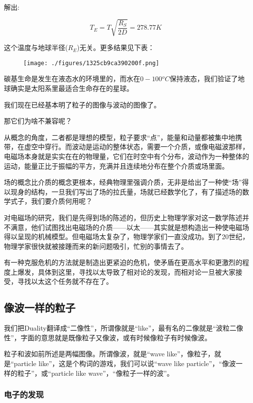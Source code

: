 解出:

\begin{equation}
T_E = T \sqrt{\frac{R_S}{2D}} = 278.77 K~
\end{equation}

这个温度与地球半径($R_E$)无关。更多结果见下表：

\begin{figure}[ht]
\centering
\texttt{[image: ./figures/1325cb9ca390200f.png]}
\caption \label{fig_QMPre5_8}
\end{figure}

碳基生命是发生在液态水的环境里的，而水在$0 - 100 {}^o C$保持液态，我们验证了地球确实是太阳系里最适合生命存在的星球。

我们现在已经基本明了粒子的图像与波动的图像了。

那它们为啥不兼容呢？

从概念的角度，二者都是理想的模型，粒子要求“点”，能量和动量都被集中地携带，在虚空中穿行。而波动是运动的整体状态，需要一个介质，或像电磁波那样，电磁场本身就是实实在在的物理量，它们在时空中有个分布，波动作为一种整体的运动，能量正比于振幅的平方，充满并且连续地分布在整个介质或场里面。

场的概念比介质的概念更根本，经典物理里强调介质，无非是给出了一种使“场”得以现身的结构，一旦我们写出了场的拉氏量，场就已经数学化了，有了描述场的数学式子，我们要介质何用呢？

对电磁场的研究，我们是先得到场的陈述的，但历史上物理学家对这一数学陈述并不满意，他们试图找出电磁场的介质——以太——其实就是想构造出一种使电磁场得以呈现的机械模型。但电磁场太复杂了，物理学家们一直没成功。到了20世纪，物理学家很快就被接踵而来的新问题吸引，忙别的事情去了。

有一种克服危机的方法就是制造出更紧迫的危机，使矛盾在更高水平和更激烈的程度上爆发，具体到这里，寻找以太导致了相对论的发现，而相对论一旦被大家接受，寻找以太这个任务就不存在了。

\subsection{像波一样的粒子}

我们把Duality翻译成“二像性”，所谓像就是“like”，最有名的二像就是“波粒二像性”，字面的意思就是既像粒子又像波，或有时候像粒子有时候像波。

粒子和波如前所述是两幅图像。所谓像波，就是“wave like”，像粒子，就是“particle like”，这是个构词的游戏，我们可以说“wave like particle”，“像波一样的粒子”，或“particle like wave”，“像粒子一样的波”。

\subsubsection{电子的发现}

